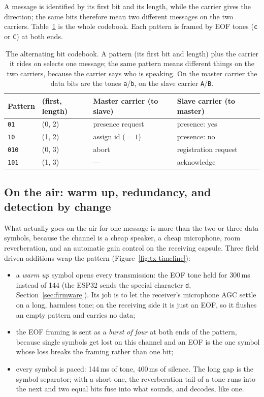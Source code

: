 \documentclass[a4paper,11pt]{article}
\begin{document}
A message is identified by its first bit and its length, while the carrier gives the
direction; the same bits therefore mean two different messages on the two carriers.
Table~\ref{tab:codebook} is the whole codebook. Each pattern is framed by EOF tones
(\texttt{c} or \texttt{C}) at both ends.

\begin{table}[H]
\centering
\caption{The alternating bit codebook. A pattern (its first bit and length) plus the
carrier it rides on selects one message; the same pattern means different things on
the two carriers, because the carrier says who is speaking. On the master carrier the
data bits are the tones \texttt{a}/\texttt{b}, on the slave carrier \texttt{A}/\texttt{B}.}
\label{tab:codebook}
\begin{tabular}{llll}
\toprule
\textbf{Pattern} & \textbf{(first, length)} & \textbf{Master carrier (to slave)} & \textbf{Slave carrier (to master)} \\
\midrule
\texttt{01}  & (0, 2) & presence request   & presence: yes         \\
\texttt{10}  & (1, 2) & assign id ($=1$)   & presence: no          \\
\texttt{010} & (0, 3) & abort              & registration request  \\
\texttt{101} & (1, 3) & ---                & acknowledge           \\
\bottomrule
\end{tabular}
\end{table}

\subsection{On the air: warm up, redundancy, and detection by change}

What actually goes on the air for one message is more than the two or three data
symbols, because the channel is a cheap speaker, a cheap microphone, room
reverberation, and an automatic gain control on the receiving capsule. Three
field driven additions wrap the pattern (Figure~\ref{fig:tx-timeline}):

\begin{itemize}
\item a \emph{warm up} symbol opens every transmission: the EOF tone held for
      300\,ms instead of 144 (the ESP32 sends the special character \texttt{d},
      Section~\ref{sec:firmware}). Its job is to let the receiver's microphone
      AGC settle on a long, harmless tone; on the receiving side it is just an
      EOF, so it flushes an empty pattern and carries no data;
\item the EOF framing is sent as a \emph{burst of four} at both ends of the
      pattern, because single symbols get lost on this channel and an EOF is the
      one symbol whose loss breaks the framing rather than one bit;
\item every symbol is paced: 144\,ms of tone, 400\,ms of silence. The long gap is
      the symbol separator; with a short one, the reverberation tail of a tone
      runs into the next and two equal bits fuse into what sounds, and decodes,
      like one.
\end{itemize}
\end{document}
